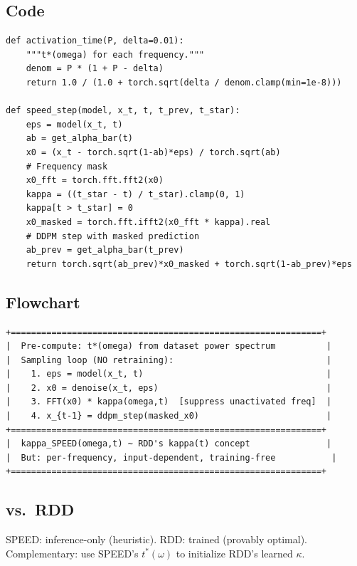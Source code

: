 \documentclass[11pt, a4paper]{article}
\begin{document}
\subsection{Code}

\begin{lstlisting}[caption={SPEED: Activation Time and Sampling}]
def activation_time(P, delta=0.01):
    """t*(omega) for each frequency."""
    denom = P * (1 + P - delta)
    return 1.0 / (1.0 + torch.sqrt(delta / denom.clamp(min=1e-8)))

def speed_step(model, x_t, t, t_prev, t_star):
    eps = model(x_t, t)
    ab = get_alpha_bar(t)
    x0 = (x_t - torch.sqrt(1-ab)*eps) / torch.sqrt(ab)
    # Frequency mask
    x0_fft = torch.fft.fft2(x0)
    kappa = ((t_star - t) / t_star).clamp(0, 1)
    kappa[t > t_star] = 0
    x0_masked = torch.fft.ifft2(x0_fft * kappa).real
    # DDPM step with masked prediction
    ab_prev = get_alpha_bar(t_prev)
    return torch.sqrt(ab_prev)*x0_masked + torch.sqrt(1-ab_prev)*eps
\end{lstlisting}

\subsection{Flowchart}

\begin{lstlisting}[style=flowchart, caption={SPEED Inference}]
+=============================================================+
|  Pre-compute: t*(omega) from dataset power spectrum          |
|  Sampling loop (NO retraining):                              |
|    1. eps = model(x_t, t)                                    |
|    2. x0 = denoise(x_t, eps)                                 |
|    3. FFT(x0) * kappa(omega,t)  [suppress unactivated freq]  |
|    4. x_{t-1} = ddpm_step(masked_x0)                         |
+=============================================================+
|  kappa_SPEED(omega,t) ~ RDD's kappa(t) concept               |
|  But: per-frequency, input-dependent, training-free           |
+=============================================================+
\end{lstlisting}

\subsection{vs.\ RDD}

SPEED: inference-only (heuristic). RDD: trained (provably optimal). Complementary: use SPEED's $t^*(\omega)$ to initialize RDD's learned $\kappa$.
\end{document}

